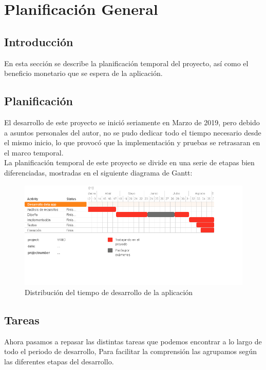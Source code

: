 \section{Planificación General}

\subsection{Introducción}
\quad En esta sección se describe la planificación temporal del proyecto, así como el beneficio monetario que se espera de la aplicación.\\

\subsection{Planificación}

\quad El desarrollo de este proyecto se inició seriamente en Marzo de 2019, pero debido a asuntos personales del autor, no se pudo dedicar todo el tiempo necesario desde el mismo inicio, lo que provocó que la implementación y pruebas se retrasaran en el marco temporal.\\

\quad La planificación temporal de este proyecto se divide en una serie de etapas bien diferenciadas, mostradas en el siguiente diagrama de Gantt:\\

\begin{figure}[htb]
	\centering
	\includegraphics[width=1.2\textwidth]{./imagenes/diagramaGantt}
	\caption{Distribución del tiempo de desarrollo de la aplicación}
\end{figure}

\subsection{Tareas}

\quad Ahora pasamos a repasar las distintas tareas que podemos encontrar a lo largo de todo el periodo de desarrollo, Para facilitar la comprensión las agrupamos según las diferentes etapas del desarrollo.\\

